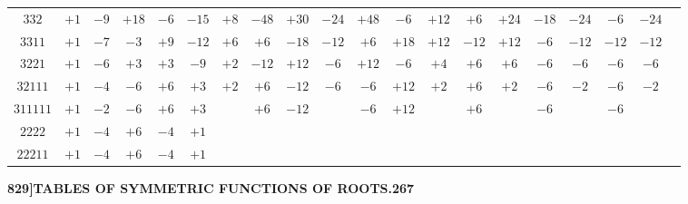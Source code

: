 \documentclass[11pt,a4paper]{book}
\begin{document}
\begin{center}
\begin{tabular}{c|c|c|c|c|c|c|c|c|c|c|c|c|c|c|c|c|c|c|c}
$332$ & $+1$ & $-9$ & $+18$ & $-6$ & $-15$ & $+8$ & $-48$ & $+30$ & $-24$ & $+48$ & $-6$ & $+12$ & $+6$ & $+24$ & $-18$ & $-24$ & $-6$ & $-24$ & \\
$3311$ & $+1$ & $-7$ & $-3$ & $+9$ & $-12$ & $+6$ & $+6$ & $-18$ & $-12$ & $+6$ & $+18$ & $+12$ & $-12$ & $+12$ & $-6$ & $-12$ & $-12$ & $-12$ & \\
$3221$ & $+1$ & $-6$ & $+3$ & $+3$ & $-9$ & $+2$ & $-12$ & $+12$ & $-6$ & $+12$ & $-6$ & $+4$ & $+6$ & $+6$ & $-6$ & $-6$ & $-6$ & $-6$ & \\
$32111$ & $+1$ & $-4$ & $-6$ & $+6$ & $+3$ & $+2$ & $+6$ & $-12$ & $-6$ & $-6$ & $+12$ & $+2$ & $+6$ & $+2$ & $-6$ & $-2$ & $-6$ & $-2$ & \\
$311111$ & $+1$ & $-2$ & $-6$ & $+6$ & $+3$ & & $+6$ & $-12$ & & $-6$ & $+12$ & & $+6$ & & $-6$ & & $-6$ & & \\
$2222$ & $+1$ & $-4$ & $+6$ & $-4$ & $+1$ & & & & & & & & & & & & & & \\
$22211$ & $+1$ & $-4$ & $+6$ & $-4$ & $+1$ & & & & & & & & & & & & & &
\end{tabular}
\end{center}

\newpage
\setcounter{page}{267}

\noindent\textbf{829]}\hfill\textbf{TABLES OF SYMMETRIC FUNCTIONS OF ROOTS.}\hfill\textbf{267}

\bigskip
\end{document}
